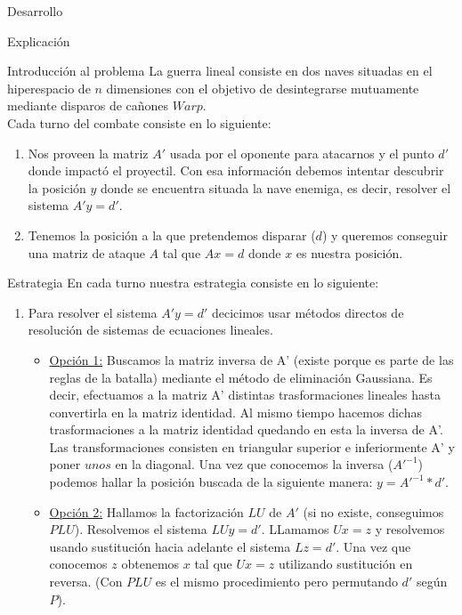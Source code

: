 \begin{section}{Desarrollo}
	\begin{subsection}{Explicación}
		\begin{subsubsection}{Introducción al problema}
			La guerra lineal consiste en dos naves situadas en el hiperespacio de $n$ dimensiones con el objetivo de desintegrarse mutuamente mediante disparos de cañones $Warp$.\\
			
			Cada turno del combate consiste en lo siguiente:
			\begin{enumerate}
			\item Nos proveen la matriz $A'$ usada por el oponente para atacarnos y el punto $d'$ donde impactó el proyectil. Con esa información debemos intentar descubrir la posición $y$ donde se encuentra situada la nave enemiga, es decir, resolver el sistema $A'y=d'$.
					
			\item Tenemos la posición a la que pretendemos disparar ($d$) y queremos conseguir una matriz de ataque $A$ tal que $Ax=d$ donde $x$ es nuestra posición.
			\end{enumerate}
		\end{subsubsection}
		\begin{subsubsection}{Estrategia}
			En cada turno nuestra estrategia consiste en lo siguiente:
			
			\begin{enumerate}
			\item Para resolver el sistema $A'y=d'$ decicimos usar métodos directos de resolución de sistemas de ecuaciones lineales.
				\begin{itemize}
					\item \underline{Opción 1:} Buscamos la matriz inversa de A' (existe porque es parte de las reglas de la batalla) mediante el método de eliminación Gaussiana. Es decir, efectuamos a la matriz A' distintas trasformaciones lineales hasta convertirla en la matriz identidad. Al mismo tiempo hacemos dichas trasformaciones a la matriz identidad quedando en esta la inversa de A'.
					Las transformaciones consisten en triangular superior e inferiormente A' y poner $unos$ en la diagonal.
					Una vez que conocemos la inversa ($A'^{-1}$) podemos hallar la posición buscada de la siguiente manera: $y=A'^{-1}*d'$.\\
					
					\item \underline{Opción 2:} Hallamos la factorización $LU$ de $A'$ (si no existe, conseguimos $PLU$). Resolvemos el sistema $LUy=d'$. LLamamos $Ux=z$ y resolvemos usando sustitución hacia adelante el sistema $Lz=d'$. Una vez que conocemos $z$ obtenemos $x$ tal que $Ux=z$ utilizando sustitución en reversa. (Con $PLU$ es el mismo procedimiento pero permutando $d'$ según $P$).\\
					

\end{itemize}
\end{enumerate}
\end{subsubsection}
\end{subsection}
\end{section}

